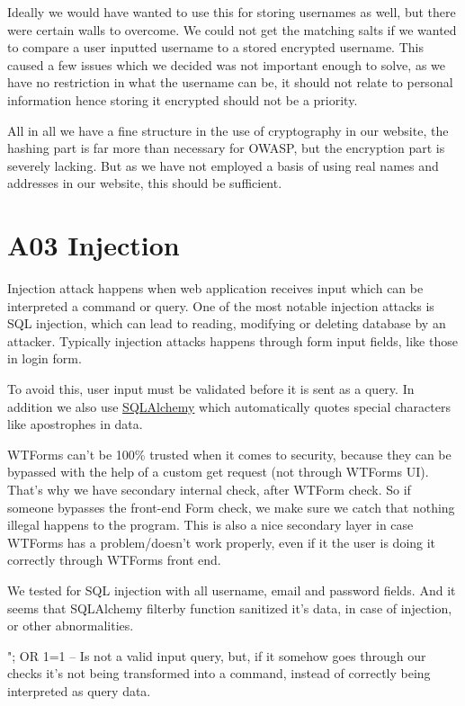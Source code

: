 Ideally we would have wanted to use this for storing usernames as well, but there were certain walls to overcome. We could not get the matching salts if we wanted to compare a user inputted username to a stored encrypted username. This caused a few issues which we decided was not important enough to solve, as we have no restriction in what the username can be, it should not relate to personal information hence storing it encrypted should not be a priority. 

All in all we have a fine structure in the use of cryptography in our website, the hashing part is far more than necessary for OWASP, but the encryption part is severely lacking. But as we have not employed a basis of using real names and addresses in our website, this should be sufficient. 

\section{A03 Injection}

Injection attack happens when web application receives input which can be interpreted a command or query. One of the most notable injection attacks is SQL injection, which can lead to reading, modifying or deleting database by an attacker. Typically injection attacks happens through form input fields, like those in login form.

To avoid this, user input must be validated before it is sent as a query. In addition we also use \href{http://www.rmunn.com/sqlalchemy-tutorial/tutorial.html}{SQLAlchemy} which automatically quotes special characters like apostrophes in data.

WTForms can't be 100\% trusted when it comes to security, because they can be bypassed with the help of a custom get request (not through WTForms UI).
That's why we have secondary internal check, after WTForm check. So if someone bypasses the front-end Form check, we make sure we catch that nothing illegal happens to the program.
This is also a nice secondary layer in case WTForms has a problem/doesn't work properly, even if it the user is doing it correctly through WTForms front end.

We tested for SQL injection with all username, email and password fields. And it seems that SQL\textunderscore Alchemy filter\textunderscore by function sanitized it's data, in case of injection, or other abnormalities.

"; OR 1=1 -- Is not a valid input query, but, if it somehow goes through our checks it's not being transformed into a command, instead of correctly being interpreted as query data.

